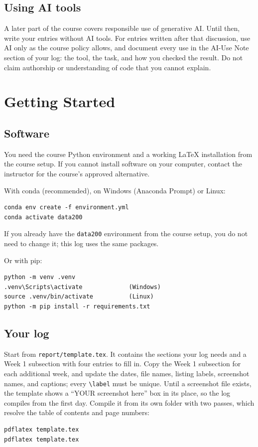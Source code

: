 \documentclass[11pt]{article}
\begin{document}
\subsection{Using AI tools}
A later part of the course covers responsible use of generative AI. Until then, write your entries without AI tools. For entries written after that discussion, use AI only as the course policy allows, and document every use in the AI-Use Note section of your log: the tool, the task, and how you checked the result. Do not claim authorship or understanding of code that you cannot explain.

\section{Getting Started}
\subsection{Software}
You need the course Python environment and a working \LaTeX{} installation from the course setup. If you cannot install software on your computer, contact the instructor for the course's approved alternative.

With conda (recommended), on Windows (Anaconda Prompt) or Linux:
\begin{lstlisting}[style=terminal]
conda env create -f environment.yml
conda activate data200
\end{lstlisting}
If you already have the \texttt{data200} environment from the course setup, you do not need to change it; this log uses the same packages.

Or with pip:
\begin{lstlisting}[style=terminal]
python -m venv .venv
.venv\Scripts\activate             (Windows)
source .venv/bin/activate          (Linux)
python -m pip install -r requirements.txt
\end{lstlisting}

\subsection{Your log}
Start from \texttt{report/template.tex}. It contains the sections your log needs and a Week 1 subsection with four entries to fill in. Copy the Week 1 subsection for each additional week, and update the dates, file names, listing labels, screenshot names, and captions; every \verb|\label| must be unique. Until a screenshot file exists, the template shows a ``YOUR screenshot here'' box in its place, so the log compiles from the first day. Compile it from its own folder with two passes, which resolve the table of contents and page numbers:
\begin{lstlisting}[style=terminal]
pdflatex template.tex
pdflatex template.tex
\end{lstlisting}
\end{document}
